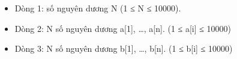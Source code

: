 \begin{itemize}
	\item     Dòng 1: số nguyên dương N (1 ≤ N ≤ 10000).   
	\item     Dòng 2: N số nguyên dương a[1], …, a[n]. (1 ≤ a[i] ≤ 10000)   
	\item     Dòng 3: N số nguyên dương b[1], …, b[n]. (1 ≤ b[i] ≤ 10000)   
\end{itemize}

\